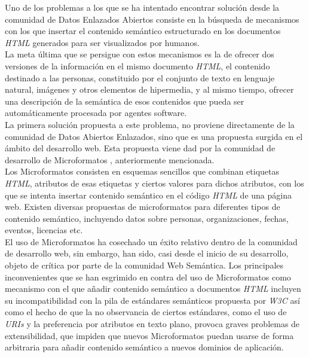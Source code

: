 Uno de los problemas a los que se ha intentado encontrar soluci\'on desde la comunidad de Datos Enlazados Abiertos consiste en la b\'usqueda de mecanismos con los que insertar el contenido sem\'antico estructurado en los documentos \textit{HTML} generados para ser visualizados por humanos.\\
La meta \'ultima que se persigue con estos mecanismos es la de ofrecer dos versiones de la informaci\'on en el mismo documento \textit{HTML}, el contenido destinado a las personas, constituido por el conjunto de texto en lenguaje natural, im\'agenes y otros elementos de hipermedia, y al mismo tiempo, ofrecer una descripci\'on de la sem\'antica de esos contenidos que pueda ser autom\'aticamente procesada por agentes software.\\
La primera soluci\'on propuesta a este problema, no proviene directamente de la comunidad de Datos Abiertos Enlazados, sino que es una propuesta surgida en el \'ambito del desarrollo web. Esta propuesta viene dad por la comunidad de desarrollo de Microformatos \cite{microformats}, anteriormente mencionada.\\
Los Microformatos consisten en esquemas sencillos que combinan etiquetas \textit{HTML}, atributos de esas etiquetas y ciertos valores para dichos atributos, con los que se intenta insertar contenido sem\'antico en el c\'odigo \textit{HTML} de una p\'agina web. Existen diversas propuestas de microformatos para diferentes tipos de contenido sem\'antico, incluyendo datos sobre personas, organizaciones, fechas, eventos, licencias etc.\\
El uso de Microformatos ha cosechado un \'exito relativo dentro de la comunidad de desarrollo web, sin embargo, han sido, casi desde el inicio de su desarrollo, objeto de cr\'itica por parte de la comunidad Web Sem\'antica. Los principales inconvenientes que se han esgrimido en contra del uso de Microformatos \cite{graf2007rdfa} como mecanismo con el que a\~nadir contenido sem\'antico a documentos \textit{HTML} incluyen su incompatibilidad con la pila de est\'andares sem\'anticos propuesta por \textit{W3C} as\'i como el hecho de que la no observancia de ciertos est\'andares, como el uso de \textit{URIs} y la preferencia por atributos en texto plano, provoca graves problemas de extensibilidad, que impiden que nuevos Microformatos puedan usarse de forma arbitraria para a\~nadir contenido sem\'antico a nuevos dominios de aplicaci\'on.\\
